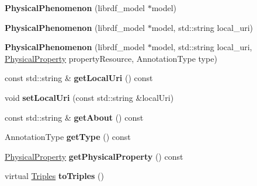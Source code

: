 \begin{DoxyCompactItemize}
{\bfseries Physical\+Phenomenon} (librdf\+\_\+model $\ast$model)
\item 
\mbox{\label{classomexmeta_1_1PhysicalPhenomenon_afc6f1152ae34116dd402a6d8d36fb0b4}} 
{\bfseries Physical\+Phenomenon} (librdf\+\_\+model $\ast$model, std\+::string local\+\_\+uri)
\item 
\mbox{\label{classomexmeta_1_1PhysicalPhenomenon_ad6499f3ca9878f5236afd41ed6839229}} 
{\bfseries Physical\+Phenomenon} (librdf\+\_\+model $\ast$model, std\+::string local\+\_\+uri, \hyperlink{classomexmeta_1_1PhysicalProperty}{Physical\+Property} property\+Resource, Annotation\+Type type)
\item 
\mbox{\label{classomexmeta_1_1PhysicalPhenomenon_a2d59ebbc920a40348d102af31ed6661a}} 
const std\+::string \& {\bfseries get\+Local\+Uri} () const
\item 
\mbox{\label{classomexmeta_1_1PhysicalPhenomenon_a84cae9aa96ca00df45b0f81dd8d3ffd4}} 
void {\bfseries set\+Local\+Uri} (const std\+::string \&local\+Uri)
\item 
\mbox{\label{classomexmeta_1_1PhysicalPhenomenon_a8be912d1256d6b913c4965f96f1b730b}} 
const std\+::string \& {\bfseries get\+About} () const
\item 
\mbox{\label{classomexmeta_1_1PhysicalPhenomenon_a9676a1dcc458247a19d19cda16d640f4}} 
Annotation\+Type {\bfseries get\+Type} () const
\item 
\mbox{\label{classomexmeta_1_1PhysicalPhenomenon_ac741cab1f6df58b0de484fc1771ef839}} 
\hyperlink{classomexmeta_1_1PhysicalProperty}{Physical\+Property} {\bfseries get\+Physical\+Property} () const
\item 
\mbox{\label{classomexmeta_1_1PhysicalPhenomenon_a30617e685bd8b155a76d38ab5a9db273}} 
virtual \hyperlink{classomexmeta_1_1Triples}{Triples} {\bfseries to\+Triples} ()
\item 
\mbox{\label{classomexmeta_1_1PhysicalPhenomenon_ae99e667cbceff2da0c4c0f5c64a8ba8f}} 

\end{DoxyCompactItemize}
